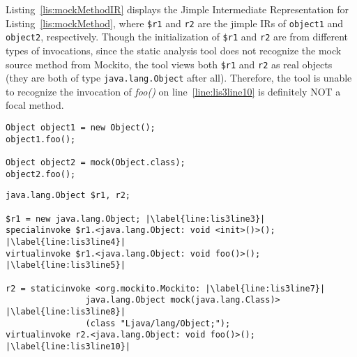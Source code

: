 Listing~\ref{lis:mockMethodIR} displays the Jimple Intermediate Representation for Listing~\ref{lis:mockMethod}, where \texttt{\$r1} and \texttt{r2} are the jimple IRs of \texttt{object1} and \texttt{object2}, respectively. Though the initialization of \texttt{\$r1} and \texttt{r2} are from different types of invocations, since the static analysis tool does not recognize the mock source method from Mockito, the tool views both \texttt{\$r1} and \texttt{r2} as real objects (they are both of type \texttt{java.lang.Object} after all). Therefore, the tool is unable to recognize the invocation of \textit{foo()} on line~\ref{line:lis3line10} is definitely NOT a focal method.

\begin{lstlisting}[basicstyle=\ttfamily, caption={A toy example illustrates a real object \texttt{object1} and a mock object \texttt{object2}, and their corresponding method invocations of \textit{foo()}.},
basicstyle=\ttfamily, captionpos=b, label=lis:mockMethod, escapechar=|, morekeywords={@Test, specialinvoke, virtualinvoke, staticinvoke}]
Object object1 = new Object();
object1.foo();

Object object2 = mock(Object.class);
object2.foo();
\end{lstlisting}



\begin{lstlisting}[basicstyle=\ttfamily, caption={Jimple Intermediate Representation for the code in Listing~\ref{lis:mockMethod}.},
basicstyle=\ttfamily, captionpos=b, label=lis:mockMethodIR, escapechar=|, morekeywords={@Test, specialinvoke, virtualinvoke, staticinvoke}]
java.lang.Object $r1, r2;

$r1 = new java.lang.Object; |\label{line:lis3line3}|
specialinvoke $r1.<java.lang.Object: void <init>()>(); |\label{line:lis3line4}|
virtualinvoke $r1.<java.lang.Object: void foo()>(); |\label{line:lis3line5}|

r2 = staticinvoke <org.mockito.Mockito: |\label{line:lis3line7}|
				java.lang.Object mock(java.lang.Class)> |\label{line:lis3line8}|
				(class "Ljava/lang/Object;");
virtualinvoke r2.<java.lang.Object: void foo()>(); |\label{line:lis3line10}|
\end{lstlisting}


